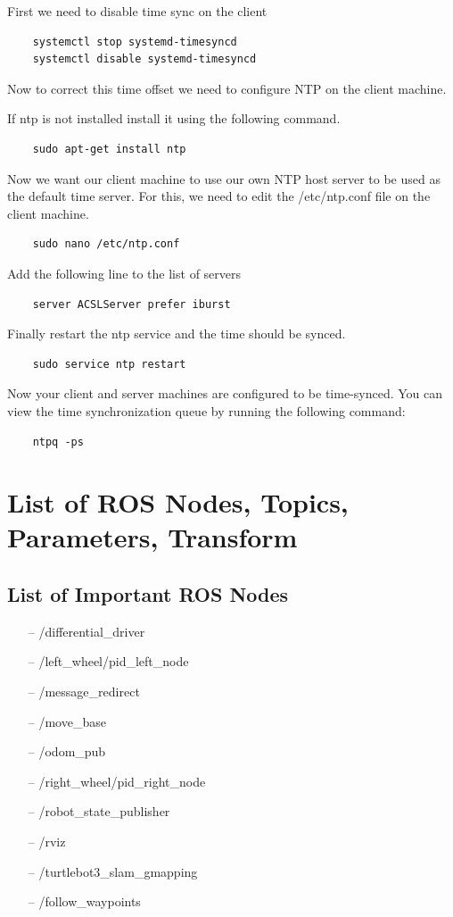 \documentclass[12]{article}
\begin{document}
First we need to disable time sync on the client
\begin{lstlisting}
	systemctl stop systemd-timesyncd
	systemctl disable systemd-timesyncd
\end{lstlisting}

Now to correct this time offset we need to configure NTP on the client machine. 

If ntp is not installed install it using the following command.

\begin{lstlisting}
	sudo apt-get install ntp
\end{lstlisting}

Now we want our client machine to use our own NTP host server to be used as the default time server. For this, we need to edit the /etc/ntp.conf file on the client machine.

\begin{lstlisting}
	sudo nano /etc/ntp.conf
\end{lstlisting}

Add the following line to the list of servers

\begin{lstlisting}
	server ACSLServer prefer iburst
\end{lstlisting}

Finally restart the ntp service and the time should be synced.

\begin{lstlisting}
	sudo service ntp restart
\end{lstlisting}

Now your client and server machines are configured to be time-synced. You can view the time synchronization queue by running the following command:


\begin{lstlisting}
	ntpq -ps
\end{lstlisting}


\newpage
\section{List of ROS Nodes, Topics, Parameters, Transform}
\subsection{List of Important ROS Nodes}


\begin{itemize}
    \item[--] /differential\_driver
    \item[--] /left\_wheel/pid\_left\_node
    \item[--] /message\_redirect
    \item[--] /move\_base
    \item[--] /odom\_pub
    \item[--] /right\_wheel/pid\_right\_node
    \item[--] /robot\_state\_publisher
    \item[--] /rviz
    \item[--] /turtlebot3\_slam\_gmapping
    \item[--] /follow\_waypoints 
\end{itemize} 
\end{document}
